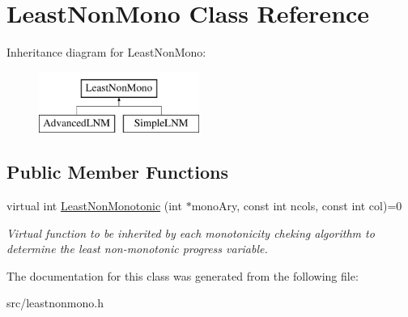 \hypertarget{classLeastNonMono}{
\section{LeastNonMono Class Reference}
\label{d9/da9/classLeastNonMono}
}
Inheritance diagram for LeastNonMono:\begin{figure}[H]
\begin{center}
\leavevmode
\includegraphics[height=2cm]{d9/da9/classLeastNonMono}
\end{center}
\end{figure}
\subsection*{Public Member Functions}
\begin{DoxyCompactItemize}
\item 
\hypertarget{classLeastNonMono_a239cbd7836950dc7c758138c4db00d0c}{
virtual int \hyperlink{classLeastNonMono_a239cbd7836950dc7c758138c4db00d0c}{LeastNonMonotonic} (int $\ast$monoAry, const int ncols, const int col)=0}
\label{d9/da9/classLeastNonMono_a239cbd7836950dc7c758138c4db00d0c}

\begin{DoxyCompactList}\small\item\em Virtual function to be inherited by each monotonicity cheking algorithm to determine the least non-\/monotonic progress variable. \item\end{DoxyCompactList}\end{DoxyCompactItemize}


The documentation for this class was generated from the following file:\begin{DoxyCompactItemize}
\item 
src/leastnonmono.h\end{DoxyCompactItemize}

